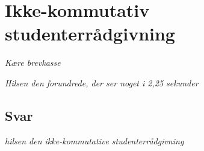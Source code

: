 \begin{minipage}[t]{170mm}
\vspace{3mm}
\section*{Ikke-kommutativ studenterrådgivning}
\emph{Kære brevkasse}


\emph{Hilsen den forundrede, der ser noget i 2,25 sekunder}

\subsection*{Svar}

{\flushright\emph{hilsen den ikke-kommutative studenterrådgivning}}


\vspace{3mm}


\end{minipage}
